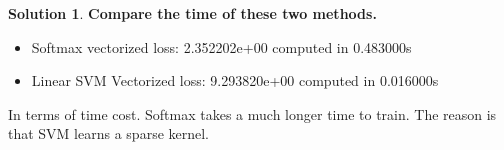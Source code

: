 \documentclass[]{book}
\theoremstyle{definition}
\newtheorem*{soln}{Solution}
\begin{document}
\begin{enumerate}
\begin{soln}
	    \textbf{Compare the time of these two methods.}
	    \begin{itemize}
	    	\item Softmax vectorized loss: 2.352202e+00 computed in 0.483000s
	    	\item Linear SVM Vectorized loss: 9.293820e+00 computed in 0.016000s
	    \end{itemize}
    	In terms of time cost. Softmax takes a much longer time to train. The reason is that SVM learns a sparse kernel.
    	
	    
		
	\end{soln}

\end{enumerate}
\end{document}
